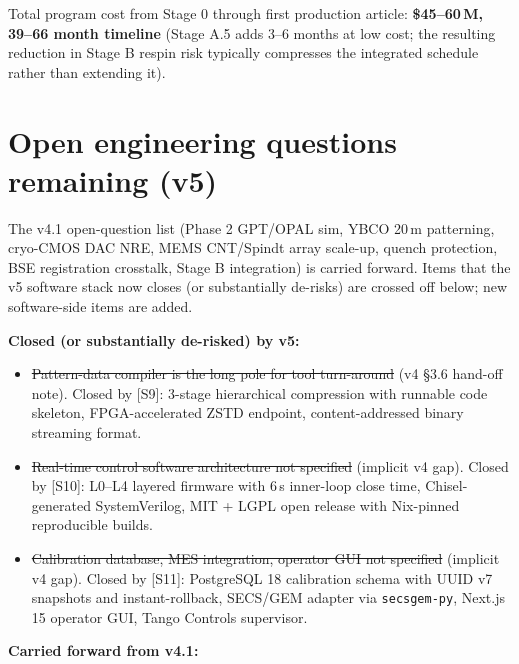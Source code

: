 \documentclass[11pt,letterpaper]{article}
\begin{document}
Total program cost from Stage 0 through first production article: \textbf{\$45--60\,M, 39--66 month timeline} (Stage A.5 adds 3--6 months at low cost; the resulting reduction in Stage B respin risk typically compresses the integrated schedule rather than extending it).

\section{Open engineering questions remaining (v5)}

The v4.1 open-question list (Phase 2 GPT/OPAL sim, YBCO 20\,\textmu m patterning, cryo-CMOS DAC NRE, MEMS CNT/Spindt array scale-up, quench protection, BSE registration crosstalk, Stage B integration) is carried forward. Items that the v5 software stack now closes (or substantially de-risks) are crossed off below; new software-side items are added.

\textbf{Closed (or substantially de-risked) by v5:}

\begin{itemize}[leftmargin=1.6em]
  \item \sout{Pattern-data compiler is the long pole for tool turn-around} (v4 \S 3.6 hand-off note). Closed by [S9]: 3-stage hierarchical compression with runnable code skeleton, FPGA-accelerated ZSTD endpoint, content-addressed binary streaming format.
  \item \sout{Real-time control software architecture not specified} (implicit v4 gap). Closed by [S10]: L0--L4 layered firmware with 6\,\textmu s inner-loop close time, Chisel-generated SystemVerilog, MIT + LGPL open release with Nix-pinned reproducible builds.
  \item \sout{Calibration database, MES integration, operator GUI not specified} (implicit v4 gap). Closed by [S11]: PostgreSQL 18 calibration schema with UUID v7 snapshots and instant-rollback, SECS/GEM adapter via \texttt{secsgem-py}, Next.js 15 operator GUI, Tango Controls supervisor.
\end{itemize}

\textbf{Carried forward from v4.1:}
\end{document}
